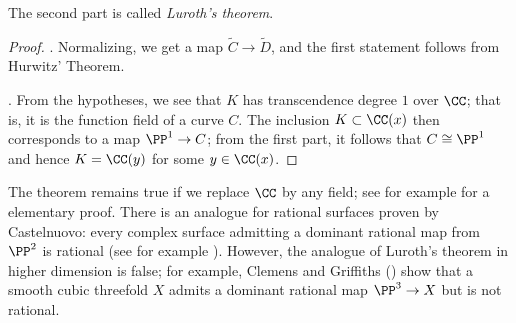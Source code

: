 The second part is called \emph{Luroth's theorem}.


\begin{proof}
. Normalizing, we get a map  $ \tilde C \to \tilde D$, and the first statement follows from Hurwitz' Theorem.

\medbreak

. From the hypotheses, we see that $K$ has transcendence degree $1$ over $\CC$; that is, it is the function field of a curve $C$. The inclusion $K \subset \CC(x)$ then corresponds to a map $\PP^1 \to C$; from the first part, it follows that $C \cong \PP^1$ and hence $K = \CC(y)$ for some $y \in \CC(x)$.
\end{proof}


%
 
\begin{fact}
The theorem remains true if we replace $\CC$ by any  field; see for example \cite[Section 8.13]{JacobsonII} for a elementary proof.
There is an analogue for rational surfaces proven by Castelnuovo: every complex surface admitting a dominant rational
map from $\PP^2$ is rational (see for example \cite[Corollary V.5]{Beauville}). However, the analogue of Luroth's theorem in higher dimension is false; for example, Clemens and Griffiths (\cite{}) show that a smooth cubic threefold $X$ admits a dominant rational map $\PP^3 \to X$ but is not rational.
\end{fact}

